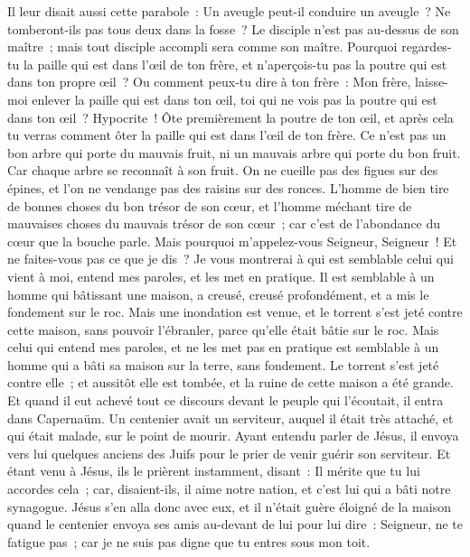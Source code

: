 \begin{multicols}{2}
Il leur disait aussi cette parabole~: Un aveugle peut-il conduire un aveugle~? Ne tomberont-ils pas tous deux dans la fosse~?
Le disciple n'est pas au-dessus de son maître~; mais tout disciple accompli sera comme son maître.
Pourquoi regardes-tu la paille qui est dans l'œil de ton frère, et n'aperçois-tu pas la poutre qui est dans ton propre œil~?
Ou comment peux-tu dire à ton frère~: Mon frère, laisse-moi enlever la paille qui est dans ton œil, toi qui ne vois pas la poutre qui est dans ton œil~? Hypocrite~! Ôte premièrement la poutre de ton œil, et après cela tu verras comment ôter la paille qui est dans l'œil de ton frère.
Ce n'est pas un bon arbre qui porte du mauvais fruit, ni un mauvais arbre qui porte du bon fruit.
Car chaque arbre se reconnaît à son fruit. On ne cueille pas des figues sur des épines, et l'on ne vendange pas des raisins sur des ronces.
L'homme de bien tire de bonnes choses du bon trésor de son cœur, et l'homme méchant tire de mauvaises choses du mauvais trésor de son cœur~; car c'est de l'abondance du cœur que la bouche parle.
Mais pourquoi m'appelez-vous Seigneur, Seigneur~! Et ne faites-vous pas ce que je dis~?
Je vous montrerai à qui est semblable celui qui vient à moi, entend mes paroles, et les met en pratique.
Il est semblable à un homme qui bâtissant une maison, a creusé, creusé profondément, et a mis le fondement sur le roc. Mais une inondation est venue, et le torrent s'est jeté contre cette maison, sans pouvoir l'ébranler, parce qu'elle était bâtie sur le roc.
Mais celui qui entend mes paroles, et ne les met pas en pratique est semblable à un homme qui a bâti sa maison sur la terre, sans fondement. Le torrent s'est jeté contre elle~; et aussitôt elle est tombée, et la ruine de cette maison a été grande.
\VerseOne{}Et quand il eut achevé tout ce discours devant le peuple qui l'écoutait, il entra dans Capernaüm.
Un centenier avait un serviteur, auquel il était très attaché, et qui était malade, sur le point de mourir.
Ayant entendu parler de Jésus, il envoya vers lui quelques anciens des Juifs pour le prier de venir guérir son serviteur.
Et étant venu à Jésus, ils le prièrent instamment, disant~: Il mérite que tu lui accordes cela~;
car, disaient-ils, il aime notre nation, et c'est lui qui a bâti notre synagogue.
Jésus s'en alla donc avec eux, et il n'était guère éloigné de la maison quand le centenier envoya ses amis au-devant de lui pour lui dire~: Seigneur, ne te fatigue pas~; car je ne suis pas digne que tu entres sous mon toit.

\end{multicols}
